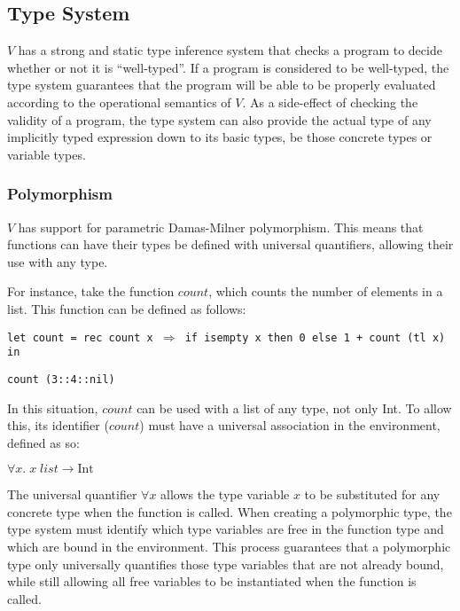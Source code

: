 \documentclass{article}
\def\code#1{\begin{footnotesize}\texttt{#1}\end{footnotesize}}
\begin{document}
\subsection{Type System}\label{Type System}

$V$ has a strong and static type inference system that checks a program to decide whether or not it is "`well-typed"'.
If a program is considered to be well-typed, the type system guarantees that the program will be able to be properly evaluated according to the operational semantics of $V$.
As a side-effect of checking the validity of a program, the type system can also provide the actual type of any implicitly typed expression down to its basic types, be those concrete types or variable types.

\subsubsection{Polymorphism}\label{Polymorphism}

$V$ has support for parametric Damas\hyp Milner polymorphism.
This means that functions can have their types be defined with universal quantifiers, allowing their use with any type.

For instance, take the function $count$, which counts the number of elements in a list.
This function can be defined as follows:

\smallskip

\code{let count = rec count x $\Rightarrow$ if isempty x then 0 else 1 + count (tl x) in}

\code{count (3::4::nil)}

\smallskip

In this situation, $count$ can be used with a list of any type, not only Int.
To allow this, its identifier ($count$) must have a universal association in the environment, defined as so:

\smallskip
$\forall x. \; x \; list \rightarrow \mbox{Int}$
\smallskip

The universal quantifier $\forall x$ allows the type variable $x$ to be substituted for any concrete type when the function is called.
When creating a polymorphic type, the type system must identify which type variables are free in the function type and which are bound in the environment.
This process guarantees that a polymorphic type only universally quantifies those type variables that are not already bound, while still allowing all free variables to be instantiated when the function is called.
\end{document}
